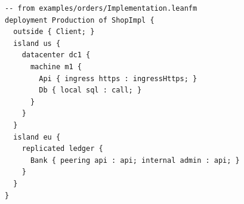 \begin{lstlisting}[language={},basicstyle=\ttfamily\footnotesize,breaklines=true]
-- from examples/orders/Implementation.leanfm
deployment Production of ShopImpl {
  outside { Client; }
  island us {
    datacenter dc1 {
      machine m1 {
        Api { ingress https : ingressHttps; }
        Db { local sql : call; }
      }
    }
  }
  island eu {
    replicated ledger {
      Bank { peering api : api; internal admin : api; }
    }
  }
}
\end{lstlisting}
